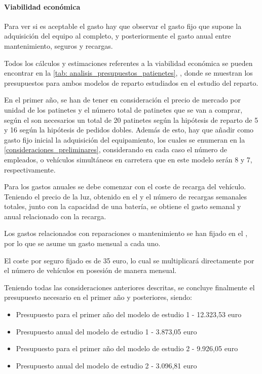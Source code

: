 \paragraph{Viabilidad económica}

Para ver si es aceptable el gasto hay que observar el gasto fijo que supone la adquisición del equipo al completo, y posteriormente el gasto anual entre mantenimiento, seguros y recargas. 

Todos los cálculos y estimaciones referentes a la viabilidad económica se pueden encontrar en la \autoref{tab: analisis_presupuestos_patienetes}, , donde se muestran los presupuestos para ambos modelos de reparto estudiados en el estudio del reparto.

En el primer año, se han de tener en consideración el precio de mercado por unidad de los patinetes y el número total de patinetes que se van a comprar, según el  son necesarios un total de 20 patinetes según la hipótesis de reparto de 5  y 16 según la hipótesis de pedidos dobles. Además de esto, hay que añadir como gasto fijo inicial la adquisición del equipamiento, los cuales se enumeran en la \autoref{consideraciones_preliminares}, considerando en cada caso el número de empleados, o vehículos simultáneos en carretera que en este modelo serán 8 y 7, respectivamente.

Para los gastos anuales se debe comenzar con el coste de recarga del vehículo. Teniendo el precio de la luz, obtenido en el  y el número de recargas semanales totales, junto con la capacidad de una batería, se obtiene el gasto semanal y anual relacionado con la recarga.

Los gastos relacionados con reparaciones o mantenimiento se han fijado en el , por lo que se asume un gasto mensual a cada uno. 

El coste por seguro fijado es de 35 \gls{euro}, lo cual se multiplicará directamente por el número de vehículos en posesión de manera mensual.

Teniendo todas las consideraciones anteriores descritas, se concluye finalmente el presupuesto necesario en el primer año y posteriores, siendo:

\begin{itemize}
    \item Presupuesto para el primer año del modelo de estudio 1 - 12.323,53 \gls{euro}
    \item Presupuesto anual del modelo de estudio 1 - 3.873,05 \gls{euro}
    \item Presupuesto para el primer año del modelo de estudio 2 - 9.926,05 \gls{euro}
    \item Presupuesto anual del modelo de estudio 2 - 3.096,81 \gls{euro}
\end{itemize}


